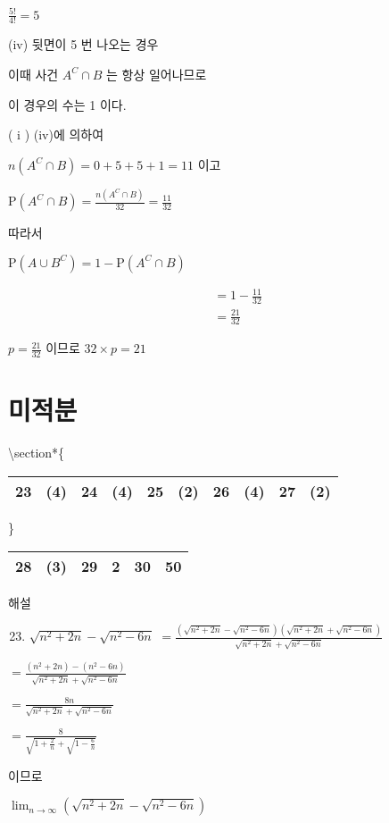 \documentclass[10pt]{article}
\begin{document}
$\frac{5!}{4!}=5$

(iv) 뒷면이 5 번 나오는 경우

이때 사건 $A^{C} \cap B$ 는 항상 일어나므로

이 경우의 수는 1 이다.

( i ) (iv)에 의하여

$n\left(A^{C} \cap B\right)=0+5+5+1=11$ 이고

$\mathrm{P}\left(A^{C} \cap B\right)=\frac{n\left(A^{C} \cap B\right)}{32}=\frac{11}{32}$

따라서

$\mathrm{P}\left(A \cup B^{C}\right)=1-\mathrm{P}\left(A^{C} \cap B\right)$

\[
\begin{aligned}
& =1-\frac{11}{32} \\
& =\frac{21}{32}
\end{aligned}
\]

$p=\frac{21}{32}$ 이므로 $32 \times p=21$

\section*{미적분}
\textbackslash section*\{\begin{tabular}{|l|l|l|l|l|l|l|l|l|l|}
\hline
23 & (4) & 24 & (4) & 25 & (2) & 26 & (4) & 27 & (2) \\
\hline
\end{tabular}\} \begin{tabular}{l|l|l|l|l|l|}
\hline
28 & (3) & 29 & 2 & 30 & 50 \\
\hline
\end{tabular}

해설

\begin{enumerate}
  \setcounter{enumi}{22}
  \item $\sqrt{n^{2}+2 n}-\sqrt{n^{2}-6 n}$ $=\frac{\left(\sqrt{n^{2}+2 n}-\sqrt{n^{2}-6 n}\right)\left(\sqrt{n^{2}+2 n}+\sqrt{n^{2}-6 n}\right)}{\sqrt{n^{2}+2 n}+\sqrt{n^{2}-6 n}}$
\end{enumerate}

$=\frac{\left(n^{2}+2 n\right)-\left(n^{2}-6 n\right)}{\sqrt{n^{2}+2 n}+\sqrt{n^{2}-6 n}}$

$=\frac{8 n}{\sqrt{n^{2}+2 n}+\sqrt{n^{2}-6 n}}$

$=\frac{8}{\sqrt{1+\frac{2}{n}}+\sqrt{1-\frac{6}{n}}}$

이므로

$\lim _{n \rightarrow \infty}\left(\sqrt{n^{2}+2 n}-\sqrt{n^{2}-6 n}\right)$
\end{document}
